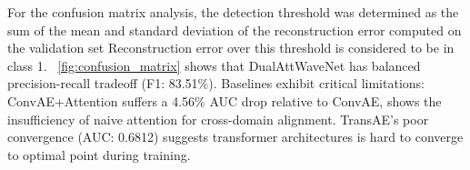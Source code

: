 \documentclass[10pt, conference]{IEEEtran}
\begin{document}


For the confusion matrix analysis, the detection threshold was determined as the sum of the mean and standard deviation of the reconstruction error computed on the validation set  Reconstruction error over this threshold is considered to be in class 1. \figurename~\ref{fig:confusion_matrix} shows that DualAttWaveNet has balanced precision-recall tradeoff (F1: 83.51\%). Baselines exhibit critical limitations: ConvAE+Attention suffers a 4.56\% AUC drop relative to ConvAE, shows  the insufficiency of naive attention for cross-domain alignment. TransAE’s poor convergence (AUC: 0.6812) suggests transformer architectures is hard to converge to optimal point during training.
\end{document}
